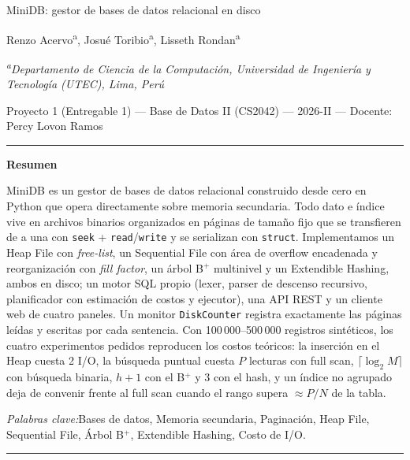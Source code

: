 \documentclass[11pt,a4paper]{article}
\newcommand{\code}[1]{\texttt{#1}}
\begin{document}
\thispagestyle{plain}
\begin{center}
{\LARGE MiniDB: gestor de bases de datos relacional en disco\par}
\vspace{1.4em}
{\large Renzo Acervo\textsuperscript{a}, Josué Toribio\textsuperscript{a}, Lisseth Rondan\textsuperscript{a}\par}
\vspace{1em}
{\small\itshape \textsuperscript{a}Departamento de Ciencia de la Computación, Universidad de Ingeniería y
Tecnología (UTEC), Lima, Perú\par}
\vspace{0.5em}
{\small Proyecto 1 (Entregable 1) --- Base de Datos II (CS2042) --- 2026-II --- Docente: Percy Lovon Ramos\par}
\end{center}

\vspace{1.5em}
\noindent\rule{\textwidth}{0.4pt}\par
\vspace{0.4em}
\noindent\textbf{Resumen}\par
\vspace{0.3em}
\noindent MiniDB es un gestor de bases de datos relacional construido desde cero en Python que opera
directamente sobre memoria secundaria. Todo dato e índice vive en archivos binarios organizados en
páginas de tamaño fijo que se transfieren de a una con \code{seek} + \code{read}/\code{write} y se
serializan con \code{struct}. Implementamos un Heap File con \emph{free-list}, un Sequential File
con área de overflow encadenada y reorganización con \emph{fill factor}, un árbol B$^+$ multinivel y
un Extendible Hashing, ambos en disco; un motor SQL propio (lexer, parser de descenso recursivo,
planificador con estimación de costos y ejecutor), una API REST y un cliente web de cuatro paneles.
Un monitor \code{DiskCounter} registra exactamente las páginas leídas y escritas por cada sentencia.
Con 100\,000--500\,000 registros sintéticos, los cuatro experimentos pedidos reproducen los costos
teóricos: la inserción en el Heap cuesta 2 I/O, la búsqueda puntual cuesta $P$ lecturas con full scan,
$\lceil\log_2 M\rceil$ con búsqueda binaria, $h+1$ con el B$^+$ y 3 con el hash, y un índice no agrupado
deja de convenir frente al full scan cuando el rango supera $\approx P/N$ de la tabla.

\vspace{0.6em}
\noindent\textit{Palabras clave:}\enspace Bases de datos, Memoria secundaria, Paginación, Heap File,
Sequential File, Árbol B$^+$, Extendible Hashing, Costo de I/O.\par
\vspace{0.3em}
\noindent\rule{\textwidth}{0.4pt}
\end{document}
